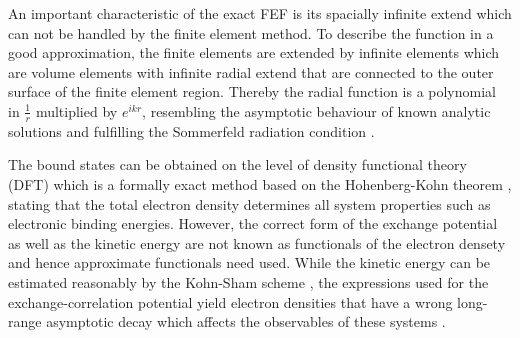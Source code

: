An important characteristic of the exact FEF is its spacially infinite extend which can not be handled by the finite element method.
To describe the function in a good approximation, the finite elements are extended by infinite elements \cite{astley3, astley2, Astley,dreyer} which are volume elements with infinite radial extend that are connected to the outer surface of the finite element region.
Thereby the radial function is a polynomial in $\frac 1r$ multiplied by $e^{ikr}$, resembling the asymptotic behaviour of known analytic solutions and fulfilling the Sommerfeld radiation condition \cite{sommerfeldCond}.

The bound states can be obtained on the level of density functional theory (DFT) which is a formally exact method based on the Hohenberg-Kohn theorem \cite{HohenbergKohn}, stating that the total electron density determines all system properties such as electronic binding energies.
However, the correct form of the exchange potential as well as the kinetic energy are not known as functionals of the electron densety and hence approximate functionals need used.
While the kinetic energy can be estimated reasonably by the Kohn-Sham scheme \cite{KohnSham}, the expressions used for the exchange-correlation potential yield electron densities that have a wrong long-range asymptotic decay which affects the observables of these systems \cite{Koerzd1, Koerzd2, Bokareva}.
